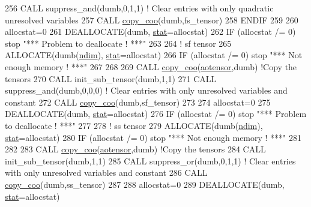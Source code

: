 \begin{DoxyCode}
256         \textcolor{keyword}{CALL }suppress\_and(dumb,0,1,1) \textcolor{comment}{! Clear entries with only quadratic unresolved variables }
257         \textcolor{keyword}{CALL }\hyperlink{namespacetensor_a14f95c256cdf137ca0767ddb3c87deea}{copy\_coo}(dumb,fs\_tensor)
258 \textcolor{keywordflow}{    ENDIF}
259 
260     allocstat=0
261     \textcolor{keyword}{DEALLOCATE}(dumb, \hyperlink{namespacestat}{stat}=allocstat)
262     \textcolor{keywordflow}{IF} (allocstat /= 0)  stop \textcolor{stringliteral}{"*** Problem to deallocate ! ***"}
263 
264     \textcolor{comment}{! sf tensor}
265     \textcolor{keyword}{ALLOCATE}(dumb(\hyperlink{namespaceparams_a2323fe1773f086e20c14f266351c482b}{ndim}), \hyperlink{namespacestat}{stat}=allocstat)
266     \textcolor{keywordflow}{IF} (allocstat /= 0) stop \textcolor{stringliteral}{"*** Not enough memory ! ***"}
267 
268 
269     \textcolor{keyword}{CALL }\hyperlink{namespacetensor_a14f95c256cdf137ca0767ddb3c87deea}{copy\_coo}(\hyperlink{namespaceaotensor__def_a0dc43bc9294a18f2fe57b67489f1702f}{aotensor},dumb) \textcolor{comment}{!Copy the tensors}
270     \textcolor{keyword}{CALL }init\_sub\_tensor(dumb,1,1)
271     \textcolor{keyword}{CALL }suppress\_and(dumb,0,0,0) \textcolor{comment}{! Clear entries with only unresolved variables and constant}
272     \textcolor{keyword}{CALL }\hyperlink{namespacetensor_a14f95c256cdf137ca0767ddb3c87deea}{copy\_coo}(dumb,sf\_tensor)
273 
274     allocstat=0
275     \textcolor{keyword}{DEALLOCATE}(dumb, \hyperlink{namespacestat}{stat}=allocstat)
276     \textcolor{keywordflow}{IF} (allocstat /= 0)  stop \textcolor{stringliteral}{"*** Problem to deallocate ! ***"}
277 
278     \textcolor{comment}{! ss tensor}
279     \textcolor{keyword}{ALLOCATE}(dumb(\hyperlink{namespaceparams_a2323fe1773f086e20c14f266351c482b}{ndim}), \hyperlink{namespacestat}{stat}=allocstat)
280     \textcolor{keywordflow}{IF} (allocstat /= 0) stop \textcolor{stringliteral}{"*** Not enough memory ! ***"}
281 
282 
283     \textcolor{keyword}{CALL }\hyperlink{namespacetensor_a14f95c256cdf137ca0767ddb3c87deea}{copy\_coo}(\hyperlink{namespaceaotensor__def_a0dc43bc9294a18f2fe57b67489f1702f}{aotensor},dumb) \textcolor{comment}{!Copy the tensors}
284     \textcolor{keyword}{CALL }init\_sub\_tensor(dumb,1,1)
285     \textcolor{keyword}{CALL }suppress\_or(dumb,0,1,1) \textcolor{comment}{! Clear entries with only unresolved variables and constant}
286     \textcolor{keyword}{CALL }\hyperlink{namespacetensor_a14f95c256cdf137ca0767ddb3c87deea}{copy\_coo}(dumb,ss\_tensor)
287 
288     allocstat=0
289     \textcolor{keyword}{DEALLOCATE}(dumb, \hyperlink{namespacestat}{stat}=allocstat)

\end{DoxyCode}
